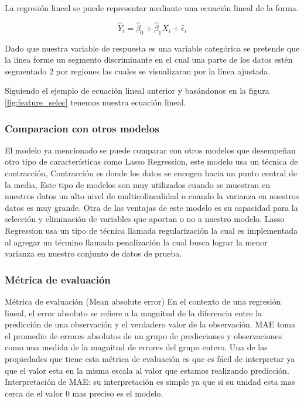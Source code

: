 \documentclass[10pt,journal]{IEEEtran}
\begin{document}
 La regresión lineal se puede representar mediante una ecuación lineal de la forma.

\begin{equation}
\hat{Y}_i = \hat{\beta}_0 + \hat{\beta}_1 X_i + \hat{\epsilon}_i
\end{equation}


Dado que nuestra variable de respuesta es una variable categórica se pretende que la línea forme un segmento discriminante en el cual una parte de los datos estén segmentado 2 por regiones las cuales se visualizaran por la línea ajustada.

Siguiendo el ejemplo de ecuación lineal anterior y basándonos en la figura \ref{fig:feature_selec} tenemos nuestra ecuación lineal.

\subsubsection{Comparacion con otros modelos}

El modelo ya mencionado se puede comparar con otros modelos que desempeñan otro tipo de características como Lasso Regression, este modelo usa un técnica de contracción, Contracción es donde los datos se encogen hacia un punto central de la media, Este tipo de modelos son muy utilizados cuando se muestran en nuestros datos un alto nivel de multicolinealidad o cuando la varianza en nuestros datos es muy grande. Otra de las ventajas de este modelo es su capacidad para la selección y eliminación de variables que aportan o no a nuestro modelo. Lasso Regression usa un tipo de técnica llamada regularización la cual es implementada al agregar un término llamada penalización la cual busca lograr la menor varianza en nuestro conjunto de datos de prueba.

\subsubsection{Métrica de evaluación}

Métrica de evaluación (Mean absolute error)
En el contexto de una regresión lineal, el error absoluto se refiere a la magnitud de la diferencia entre la predicción de una observación y el verdadero valor de la observación.
MAE toma el promedio de errores absolutos de un grupo de predicciones y observaciones como una medida de la magnitud de errores del grupo entero. Una de las propiedades que tiene esta métrica de evaluación es que es fácil de interpretar ya que el valor esta en la misma escala al valor que estamos realizando predicción.
Interpretación de MAE: su interpretación es simple ya que si su unidad esta mas cerca de el valor 0 mas preciso es el modelo.
\end{document}
